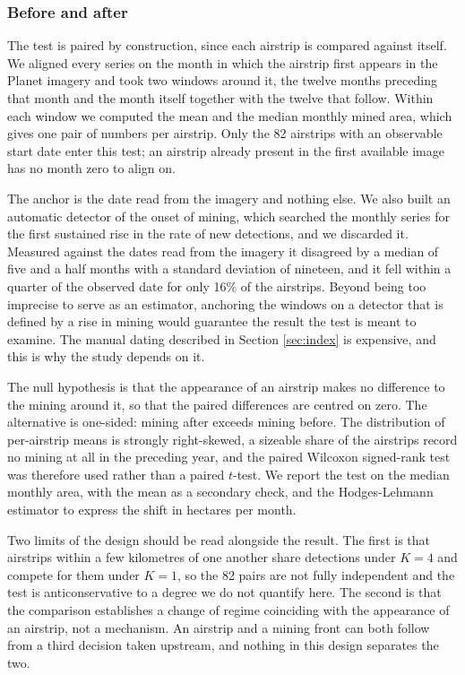 \documentclass[11pt]{article}
\begin{document}
\subsubsection{Before and after}

The test is paired by construction, since each airstrip is compared against itself. We aligned every series on the month in which the airstrip first appears in the Planet imagery and took two windows around it, the twelve months preceding that month and the month itself together with the twelve that follow. Within each window we computed the mean and the median monthly mined area, which gives one pair of numbers per airstrip. Only the 82 airstrips with an observable start date enter this test; an airstrip already present in the first available image has no month zero to align on.

The anchor is the date read from the imagery and nothing else. We also built an automatic detector of the onset of mining, which searched the monthly series for the first sustained rise in the rate of new detections, and we discarded it. Measured against the dates read from the imagery it disagreed by a median of five and a half months with a standard deviation of nineteen, and it fell within a quarter of the observed date for only 16\% of the airstrips. Beyond being too imprecise to serve as an estimator, anchoring the windows on a detector that is defined by a rise in mining would guarantee the result the test is meant to examine. The manual dating described in Section \ref{sec:index} is expensive, and this is why the study depends on it.

The null hypothesis is that the appearance of an airstrip makes no difference to the mining around it, so that the paired differences are centred on zero. The alternative is one-sided: mining after exceeds mining before. The distribution of per-airstrip means is strongly right-skewed, a sizeable share of the airstrips record no mining at all in the preceding year, and the paired Wilcoxon signed-rank test was therefore used rather than a paired $t$-test. We report the test on the median monthly area, with the mean as a secondary check, and the Hodges-Lehmann estimator to express the shift in hectares per month.

Two limits of the design should be read alongside the result. The first is that airstrips within a few kilometres of one another share detections under $K = 4$ and compete for them under $K = 1$, so the 82 pairs are not fully independent and the test is anticonservative to a degree we do not quantify here. The second is that the comparison establishes a change of regime coinciding with the appearance of an airstrip, not a mechanism. An airstrip and a mining front can both follow from a third decision taken upstream, and nothing in this design separates the two.
\end{document}
